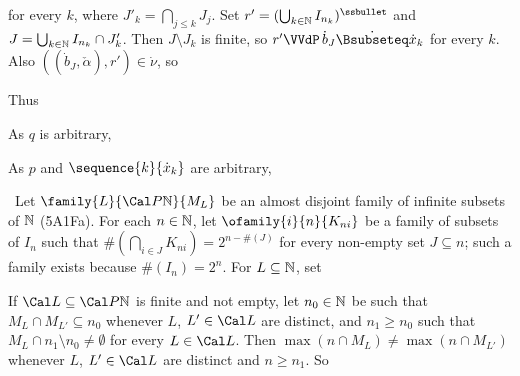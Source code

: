 {

\noindent for every $k$, where $J'_k=\bigcap_{j\le k}J_j$.   Set
$r'=(\bigcup_{k\in\Bbb N}I_{n_k})^{\ssbullet}$ and
$J=\bigcup_{k\in\Bbb N}I_{n_k}\cap J'_k$.
Then $J\setminus J_k$ is finite, so
$r'\VVdP\,\dot b_J\dot{\Bsubseteq}\dot x_k$ for every
$k$.   Also $((\dot b_J,\check\alpha),r')\in\dot\nu$, so


Thus


\noindent As $q$ is arbitrary,


\noindent As $p$ and $\sequence{k}{\dot x_k}$ are arbitrary,


\medskip



\noindent\Prf\ Let $\family{L}{\Cal P\Bbb N}{M_L}$ be an almost disjoint
family of infinite subsets of $\Bbb N$ (5A1Fa).   For each $n\in\Bbb N$,
let $\ofamily{i}{n}{K_{ni}}$ be a family of subsets of $I_n$ such that
$\#(\bigcap_{i\in J}K_{ni})=2^{n-\#(J)}$ for every non-empty set
$J\subseteq n$;  such a family exists because $\#(I_n)=2^n$.   For
$L\subseteq\Bbb N$, set


\noindent If $\Cal L\subseteq\Cal P\Bbb N$ is finite and not empty, let
$n_0\in\Bbb N$ be such that $M_L\cap M_{L'}\subseteq n_0$ whenever $L$,
$L'\in\Cal L$ are distinct, and $n_1\ge n_0$ such that
$M_L\cap n_1\setminus n_0\ne\emptyset$ for every $L\in\Cal L$.
Then $\max(n\cap M_L)\ne\max(n\cap M_{L'})$ whenever $L$, $L'\in\Cal L$ are
distinct and $n\ge n_1$.   So

}
